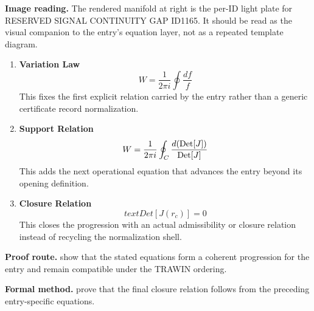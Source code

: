 \begin{samepage}
\noindent\begin{minipage}[t]{0.45\linewidth}
\vspace{0pt}
\raggedright
\scriptsize\textbf{Image reading.} The rendered manifold at right is the per-ID light plate for RESERVED SIGNAL CONTINUITY GAP ID1165. It should be read as the visual companion to the entry's equation layer, not as a repeated template diagram.\par
\end{minipage}\hfill
\begin{minipage}[t]{0.53\linewidth}
\vspace*{-0.10in}
\raggedright
{}
\end{minipage}
\end{samepage}

\clearpage


\begin{enumerate}[leftmargin=1.6em,itemsep=9pt,topsep=6pt]
\item \textbf{Variation Law}
\[
W = \frac{1}{2\pi i} \oint \frac{df}{f}
\]
This fixes the first explicit relation carried by the entry rather than a generic certificate record normalization.

\item \textbf{Support Relation}
\[
W = \frac{1}{2\pi i} \oint_C \frac{d({\rm Det}[J])}{{\rm Det}[J]}
\]
This adds the next operational equation that advances the entry beyond its opening definition.

\item \textbf{Closure Relation}
\[
text{Det}[J(r_c)] = 0
\]
This closes the progression with an actual admissibility or closure relation instead of recycling the normalization shell.
\end{enumerate}

\textbf{Proof route.} show that the stated equations form a coherent progression for the entry and remain compatible under the TRAWIN ordering.

\textbf{Formal method.} prove that the final closure relation follows from the preceding entry-specific equations.

\medskip
{}

